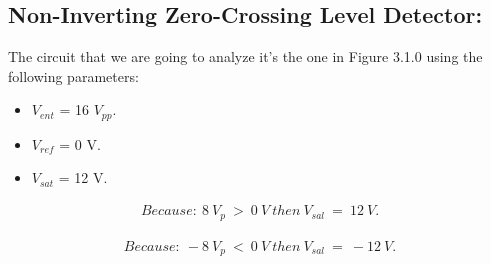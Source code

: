 \subsection{Non-Inverting Zero-Crossing Level Detector:}

The circuit that we are going to analyze it's the one in Figure 3.1.0 using the following parameters: \hfill \break

{\bfseries
\begin{itemize}
\item $V_{ent}$ = 16 $V_{pp}$.
\item $V_{ref}$ = 0 V.
\item $V_{sat}$ = 12 V.
\end{itemize}} \hfill

{\bfseries\itshape{}} 

\begin{flushright}
{\bfseries\itshape{}} \hfill \break
\end{flushright}

\begin{ceqn}
\begin{align*}
Because:\ 8\ V_{p}\ >\ 0\ V\ then\ V_{sal}\ =\ 12\ V.
\end{align*}
\end{ceqn} \hfill \break

{\bfseries\itshape{}} 

\begin{flushright}
{\bfseries\itshape{}} \hfill \break
\end{flushright}

\begin{ceqn}
\begin{align*}
Because:\ -8\ V_{p}\ <\ 0\ V\ then\ V_{sal}\ =\ -12\ V.
\end{align*}
\end{ceqn} \hfill \break

{\bfseries\itshape{}} \hfill \break

\pagebreak